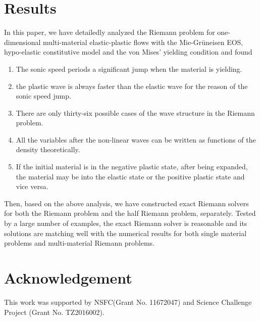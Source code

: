 \documentclass[review]{elsarticle}
\numberwithin{equation}{section}
\numberwithin{table}{section}
\begin{document}
\section{Results}
In this paper, we have detailedly analyzed the Riemann problem for one-dimensional multi-material elastic-plastic flows with the  Mie-Gr\"uneisen EOS, hypo-elastic constitutive model and the von Mises' yielding condition and found %
\begin{enumerate}
	\item The sonic speed periods a significant jump when the material is yielding.

	\item the plastic wave is always faster than the elastic wave for the reason of the sonic speed jump.
	
	  \item There are only thirty-six possible cases of the wave structure in the Riemann problem.

	 \item All the variables after the non-linear waves can be written as functions of the density theoretically.

	\item If the initial material is in the negative plastic state, after being expanded, the material may be into the elastic state or the positive plastic state and vice versa.

	\end{enumerate}
	  Then, based on the above analysis, we have constructed exact Riemann solvers for  both the Riemann problem  and the half Riemann problem, separately. Tested by  a large number of examples, the exact Riemann solver is reasonable and  its solutions  are matching well with the numerical results for both  single material problems and multi-material Riemann problems.

\section*{Acknowledgement}
This work was supported by NSFC(Grant No. 11672047) and Science Challenge Project (Grant No. TZ2016002).


\end{document}
